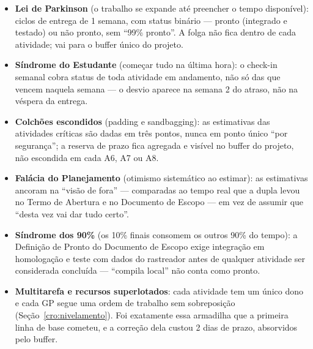 \documentclass[11pt,a4paper]{article}
\begin{document}
\begin{itemize}[itemsep=5pt]
  \item \textbf{Lei de Parkinson} (o trabalho se expande até preencher o tempo disponível): ciclos de entrega de 1 semana, com status binário --- pronto (integrado e testado) ou não pronto, sem ``99\% pronto''. A folga não fica dentro de cada atividade; vai para o buffer único do projeto.
  \item \textbf{Síndrome do Estudante} (começar tudo na última hora): o check-in semanal cobra status de toda atividade em andamento, não só das que vencem naquela semana --- o desvio aparece na semana 2 do atraso, não na véspera da entrega.
  \item \textbf{Colchões escondidos} (padding e sandbagging): as estimativas das atividades críticas são dadas em três pontos, nunca em ponto único ``por segurança''; a reserva de prazo fica agregada e visível no buffer do projeto, não escondida em cada A6, A7 ou A8.
  \item \textbf{Falácia do Planejamento} (otimismo sistemático ao estimar): as estimativas ancoram na ``visão de fora'' --- comparadas ao tempo real que a dupla levou no Termo de Abertura e no Documento de Escopo --- em vez de assumir que ``desta vez vai dar tudo certo''.
  \item \textbf{Síndrome dos 90\%} (os 10\% finais consomem os outros 90\% do tempo): a Definição de Pronto do Documento de Escopo exige integração em homologação e teste com dados do rastreador antes de qualquer atividade ser considerada concluída --- ``compila local'' não conta como pronto.
  \item \textbf{Multitarefa e recursos superlotados}: cada atividade tem um único dono e cada GP segue uma ordem de trabalho sem sobreposição (Seção~\ref{cro:nivelamento}). Foi exatamente essa armadilha que a primeira linha de base cometeu, e a correção dela custou 2 dias de prazo, absorvidos pelo buffer.
\end{itemize}
\end{document}

